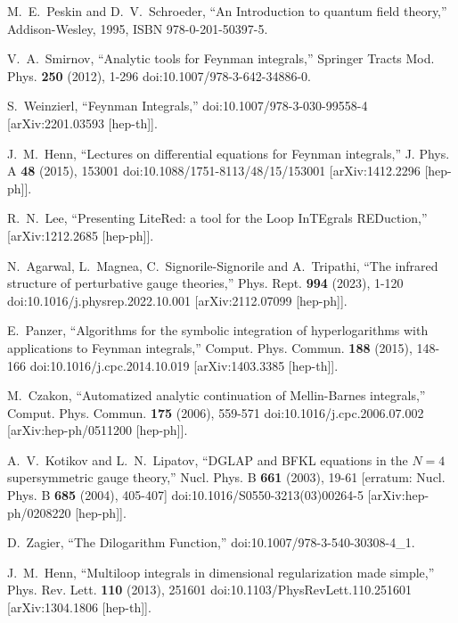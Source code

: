 M.~E.~Peskin and D.~V.~Schroeder,
``An Introduction to quantum field theory,''
Addison-Wesley, 1995,
ISBN 978-0-201-50397-5.

V.~A.~Smirnov,
``Analytic tools for Feynman integrals,''
Springer Tracts Mod. Phys. \textbf{250} (2012), 1-296
doi:10.1007/978-3-642-34886-0.

S.~Weinzierl,
``Feynman Integrals,''
doi:10.1007/978-3-030-99558-4
[arXiv:2201.03593 [hep-th]].

J.~M.~Henn,
``Lectures on differential equations for Feynman integrals,''
J. Phys. A \textbf{48} (2015), 153001
doi:10.1088/1751-8113/48/15/153001
[arXiv:1412.2296 [hep-ph]].

R.~N.~Lee,
``Presenting LiteRed: a tool for the Loop InTEgrals REDuction,''
[arXiv:1212.2685 [hep-ph]].

N.~Agarwal, L.~Magnea, C.~Signorile-Signorile and A.~Tripathi,
``The infrared structure of perturbative gauge theories,''
Phys. Rept. \textbf{994} (2023), 1-120
doi:10.1016/j.physrep.2022.10.001
[arXiv:2112.07099 [hep-ph]].

E.~Panzer,
``Algorithms for the symbolic integration of hyperlogarithms with applications to Feynman integrals,''
Comput. Phys. Commun. \textbf{188} (2015), 148-166
doi:10.1016/j.cpc.2014.10.019
[arXiv:1403.3385 [hep-th]].

M.~Czakon,
``Automatized analytic continuation of Mellin-Barnes integrals,''
Comput. Phys. Commun. \textbf{175} (2006), 559-571
doi:10.1016/j.cpc.2006.07.002
[arXiv:hep-ph/0511200 [hep-ph]].

A.~V.~Kotikov and L.~N.~Lipatov,
``DGLAP and BFKL equations in the $N=4$ supersymmetric gauge theory,''
Nucl. Phys. B \textbf{661} (2003), 19-61
[erratum: Nucl. Phys. B \textbf{685} (2004), 405-407]
doi:10.1016/S0550-3213(03)00264-5
[arXiv:hep-ph/0208220 [hep-ph]].

D.~Zagier,
``The Dilogarithm Function,''
doi:10.1007/978-3-540-30308-4\_1.

J.~M.~Henn,
``Multiloop integrals in dimensional regularization made simple,''
Phys. Rev. Lett. \textbf{110} (2013), 251601
doi:10.1103/PhysRevLett.110.251601
[arXiv:1304.1806 [hep-th]].

